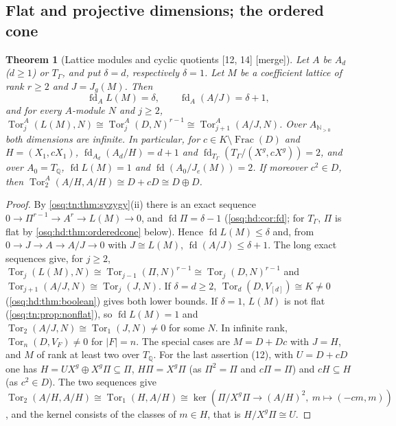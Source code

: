 \documentclass[11pt,letterpaper]{article}
\numberwithin{equation}{section}
\newtheorem{theorem}{Theorem}[section]
\theoremstyle{definition}
\theoremstyle{remark}
\theoremstyle{plain}
\newcommand{\Q}{\mathbb Q}
\newcommand{\N}{\mathbb N}
\newcommand{\Frac}{\operatorname{Frac}}
\newcommand{\Tor}{\operatorname{Tor}}
\newcommand{\fd}{\operatorname{fd}}
\newcommand{\src}[1]{\textup{\textsf{[#1]}}}
\newcommand{\merge}{\textup{\textsf{[merge]}}}
\begin{document}
\subsection{Flat and projective dimensions; the ordered cone}\label{osq:hd:sub:dimensions}

\begin{theorem}[Lattice modules and cyclic quotients \src{12, 14} \merge]\label{osq:hd:thm:fdlattice}
Let $A$ be $A_d$ ($d\ge1$) or $T_\Gamma$, and put $\delta=d$, respectively $\delta=1$. Let $M$ be a coefficient lattice of rank
$r\ge2$ and $J=J_g(M)$. Then
\[
 \fd_AL(M)=\delta,\qquad \fd_A(A/J)=\delta+1,
\]
and for every $A$-module $N$ and $j\ge2$,
$\Tor^A_j(L(M),N)\cong\Tor^A_j(D,N)^{r-1}\cong\Tor^A_{j+1}(A/J,N)$. Over $A_{\N_{>0}}$ both dimensions are infinite.
In particular, for $c\in K\setminus\Frac(D)$ and $H=(X_1,cX_1)$, $\fd_{A_d}(A_d/H)=d+1$ and $\fd_{T_\Gamma}(T_\Gamma/(X^g,cX^g))=2$,
and over $A_0=T_\Q$, $\fd L(M)=1$ and $\fd(A_0/J_e(M))=2$. If moreover $c^2\in D$, then
$\Tor_2^A(A/H,A/H)\cong D+cD\cong D\oplus D$.
\end{theorem}
\begin{proof}
By \cref{osq:tn:thm:syzygy}(ii) there is an exact sequence $0\to\Pi^{r-1}\to A^r\to L(M)\to0$, and $\fd\Pi=\delta-1$
(\cref{osq:hd:cor:fd}; for $T_\Gamma$, $\Pi$ is flat by \cref{osq:hd:thm:orderedcone} below). Hence $\fd L(M)\le\delta$ and, from
$0\to J\to A\to A/J\to0$ with $J\cong L(M)$, $\fd(A/J)\le\delta+1$. The long exact sequences give, for $j\ge2$,
$\Tor_j(L(M),N)\cong\Tor_{j-1}(\Pi,N)^{r-1}\cong\Tor_j(D,N)^{r-1}$ and $\Tor_{j+1}(A/J,N)\cong\Tor_j(J,N)$. If $\delta=d\ge2$,
$\Tor_d(D,V_{[d]})\cong K\ne0$ (\cref{osq:hd:thm:boolean}) gives both lower bounds. If $\delta=1$, $L(M)$ is not flat
(\cref{osq:tn:prop:nonflat}), so $\fd L(M)=1$ and $\Tor_2(A/J,N)\cong\Tor_1(J,N)\ne0$ for some $N$. In infinite rank,
$\Tor_n(D,V_F)\ne0$ for $|F|=n$. The special cases are $M=D+Dc$ with $J=H$, and $M$ of rank at least two over $T_\Q$. For
the last assertion (12), with $U=D+cD$ one has $H=UX^g\oplus X^g\Pi\subseteq\Pi$, $H\Pi=X^g\Pi$ (as $\Pi^2=\Pi$ and
$c\Pi=\Pi$) and $cH\subseteq H$ (as $c^2\in D$). The two sequences give
$\Tor_2(A/H,A/H)\cong\Tor_1(H,A/H)\cong\ker(\Pi/X^g\Pi\to(A/H)^2,\ m\mapsto(-cm,m))$, and the kernel consists of the
classes of $m\in H$, that is $H/X^g\Pi\cong U$.
\end{proof}
\end{document}
